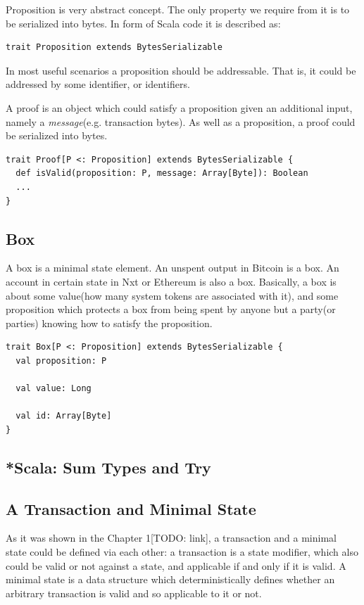 \documentclass[]{report}   %
\begin{document}
Proposition is very abstract concept. The only property we require from it is to be serialized into bytes. In form of Scala code it is described as:

\begin{lstlisting}
trait Proposition extends BytesSerializable
\end{lstlisting}

In most useful scenarios a proposition should be addressable. That is, it could be addressed by some identifier, or identifiers.

A proof is an object which could satisfy a proposition given an additional input, namely a \textit{message}(e.g. transaction bytes). As well as a proposition, a proof could be serialized into bytes. 

\begin{lstlisting}
trait Proof[P <: Proposition] extends BytesSerializable {
  def isValid(proposition: P, message: Array[Byte]): Boolean
  ...
}
\end{lstlisting}


\subsection{Box}

A box is a minimal state element. An unspent output in Bitcoin is a box. An account in certain state in Nxt or Ethereum is also a box. Basically, a box is about some value(how many system tokens are associated with it), and some proposition which protects a box from being spent by anyone but a party(or parties) knowing how to satisfy the proposition.

\begin{lstlisting}
trait Box[P <: Proposition] extends BytesSerializable {
  val proposition: P

  val value: Long

  val id: Array[Byte]
}
\end{lstlisting}


\subsection{*Scala: Sum Types and Try}

\subsection{A Transaction and Minimal State}

As it was shown in the Chapter 1[TODO: link], a transaction and a minimal state could be defined via each other: a transaction is a state modifier, which also could be valid or not against a state, and applicable if and only if it is valid. A minimal state is a data structure which deterministically defines whether an arbitrary transaction is valid and so applicable to it or not. 
\end{document}
